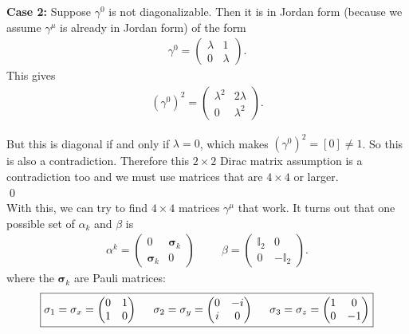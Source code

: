 \documentclass{book}
\theoremstyle{definition}
\newcommand{\lp}{\left(}
\newcommand{\rp}{\right)}
\begin{document}
\textbf{Case 2:} Suppose $\gamma^0$ is not diagonalizable. Then it is in Jordan form (because we assume $\gamma^\mu$ is already in Jordan form) of the form 
\begin{align}
\gamma^0 = \begin{pmatrix}
\lambda & 1 \\ 0 & \lambda
\end{pmatrix}.
\end{align} 
This gives
\begin{align}
\lp\gamma^0\rp^2 =\begin{pmatrix}
\lambda^2 & 2\lambda \\ 0 & \lambda^2
\end{pmatrix}.
\end{align}

But this is diagonal if and only if $\lambda = 0$, which makes ${(\gamma^0)}^2 = [0] \neq 1$. So this is also a contradiction. Therefore this $2\times 2$ Dirac matrix assumption is a contradiction too and we must use matrices that are $4\times 4$  or larger. \\ \qed\\




With this, we can try to find $4\times 4$ matrices $\gamma^\mu$ that work. It turns out that one possible set of $\alpha_k$ and $\beta$ is 
\begin{align}
\boxed{\alpha^k = \begin{pmatrix}
	0 & \mathbf{\sigma}_k \\ \mathbf{\sigma}_k & 0
	\end{pmatrix} \hspace{1cm} 
	\beta = \begin{pmatrix}
	\mathbb{I}_2 & 0 \\ 0 & -\mathbb{I}_2
	\end{pmatrix}.
}
\end{align}
where the $\mathbf{\sigma}_k$ are Pauli matrices:
\begin{align}
\boxed{\mathbf{\sigma}_1 = \sigma_x = \begin{pmatrix}
0 & 1 \\ 1 & 0
\end{pmatrix}
\hspace{0.5cm}
\mathbf{\sigma}_2 = \sigma_y = \begin{pmatrix}
0 & -i \\ i & 0
\end{pmatrix}
\hspace{0.5cm}
\mathbf{\sigma}_3 = \sigma_z = \begin{pmatrix}
1 & 0 \\ 0 & -1
\end{pmatrix}}
\end{align}
\end{document}
